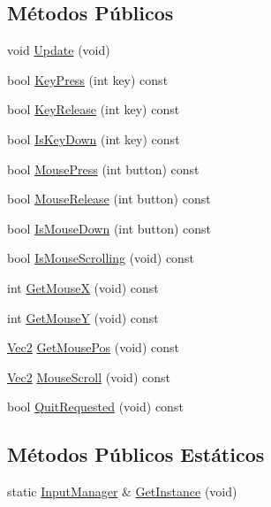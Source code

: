 \subsection*{Métodos Públicos}
\begin{DoxyCompactItemize}
\item 
void \hyperlink{classInputManager_afc344b3b2e204cfb39ee17b33bcc5eab}{Update} (void)
\item 
bool \hyperlink{classInputManager_a6793bc63304cafeaf45151d083946f42}{Key\+Press} (int key) const 
\item 
bool \hyperlink{classInputManager_a161025491900d61e6090d6f6e576934f}{Key\+Release} (int key) const 
\item 
bool \hyperlink{classInputManager_a97d25d372ab28dbc119b5a0919e38244}{Is\+Key\+Down} (int key) const 
\item 
bool \hyperlink{classInputManager_ad07e913718fc94601dfccb5c3a6fb0ae}{Mouse\+Press} (int button) const 
\item 
bool \hyperlink{classInputManager_a0056b265c8790bf862f6bff283349985}{Mouse\+Release} (int button) const 
\item 
bool \hyperlink{classInputManager_a410c6f6a0fa13dfd938d6d26a524fc19}{Is\+Mouse\+Down} (int button) const 
\item 
bool \hyperlink{classInputManager_aeb81e9386db70d1cc204e45963ec9077}{Is\+Mouse\+Scrolling} (void) const 
\item 
int \hyperlink{classInputManager_aaa3f36152ef8fdec75c0e3f5307979fb}{Get\+Mouse\+X} (void) const 
\item 
int \hyperlink{classInputManager_a3883f6471f5d124fd51990af3fdff24d}{Get\+Mouse\+Y} (void) const 
\item 
\hyperlink{classVec2}{Vec2} \hyperlink{classInputManager_a8609a7850d6c037642539c19ab53a4e8}{Get\+Mouse\+Pos} (void) const 
\item 
\hyperlink{classVec2}{Vec2} \hyperlink{classInputManager_acfca74249b64db2cb2a3b67c0e944696}{Mouse\+Scroll} (void) const 
\item 
bool \hyperlink{classInputManager_a0c96a7ae70931d034a78a8e97b70dd27}{Quit\+Requested} (void) const 
\end{DoxyCompactItemize}
\subsection*{Métodos Públicos Estáticos}
\begin{DoxyCompactItemize}
\item 
static \hyperlink{classInputManager}{Input\+Manager} \& \hyperlink{classInputManager_a1f095ed502f0bd09390d05cdc0acdcd9}{Get\+Instance} (void)
\end{DoxyCompactItemize}
